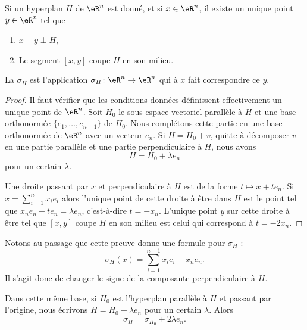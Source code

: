\begin{lemmaDef}
	Si un hyperplan \( H\) de \( \eR^n\) est donné, et si \( x\in \eR^n\), il existe un unique point \( y\in \eR^n\) tel que
	\begin{enumerate}
		\item
		      \( x-y\perp H\),
		\item
		      Le segment \( [x,y]\) coupe \( H\) en son milieu.
	\end{enumerate}
	La  \( \sigma_H\) est l'application \( \sigma_H\colon \eR^n\to \eR^n \) qui à \( x\) fait correspondre ce \( y\).
\end{lemmaDef}

\begin{proof}
	Il faut vérifier que les conditions données définissent effectivement un unique point de \( \eR^n\). Soit \( H_0\) le sous-espace vectoriel parallèle à \( H\) et une base orthonormée \( \{ e_1,\ldots, e_{n-1} \}\) de \( H_0\). Nous complétons cette partie en une base orthonormée de \( \eR^n\) avec un vecteur \( e_n\). Si \( H=H_0+v\), quitte à décomposer \( v\) en une partie parallèle et une partie perpendiculaire à \( H\), nous avons
	\begin{equation}
		H=H_0+\lambda e_n
	\end{equation}
	pour un certain \( \lambda\).

	Une droite passant par \( x\) et perpendiculaire à \( H\) est de la forme \( t\mapsto x+te_n\). Si \( x=\sum_{i=1}^{n}x_ie_i\) alors l'unique point de cette droite à être dans \( H\) est le point tel que \(   x_ne_n+te_n=\lambda e_n   \), c'est-à-dire \( t=-x_n\). L'unique point \( y\) sur cette droite à être tel que \( [x,y ]\) coupe \( H\) en son milieu est celui qui correspond à \( t=-2x_n\).
\end{proof}

Notons au passage que cette preuve donne une formule pour \( \sigma_H\) :
\begin{equation}        \label{EQooRTWLooLPsUpY}
	\sigma_H(x)=\sum_{i=1}^{n-1}x_ie_i-x_ne_n.
\end{equation}
Il s'agit donc de changer le signe de la composante perpendiculaire à \( H\).

\begin{lemma}       \label{LEMooWYVRooQmWqvM}
	Dans cette même base, si \( H_0\) est l'hyperplan parallèle à \( H\) et passant par l'origine, nous écrivons \( H=H_0+\lambda e_n\) pour un certain \( \lambda\). Alors
	\begin{equation}
		\sigma_H=\sigma_{H_0}+2\lambda e_n.
	\end{equation}
\end{lemma}

